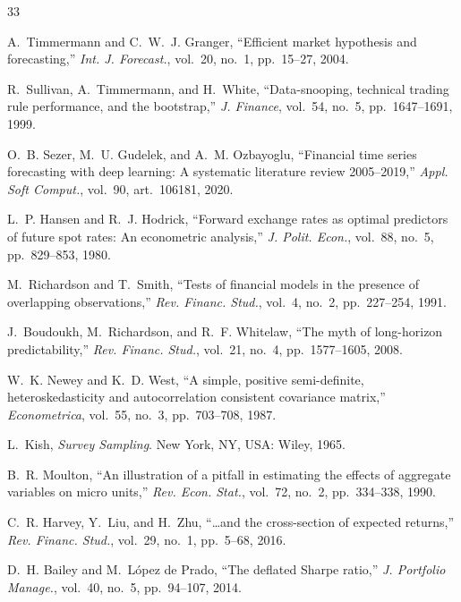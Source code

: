 \documentclass[conference]{IEEEtran}
\begin{document}
\balance
\scriptsize
\setlength{\IEEEilabelindent}{0pt}
\begin{thebibliography}{33}
\setlength{\itemsep}{0pt plus 0.1pt}
\setlength{\parskip}{0pt}

 A.~Timmermann and C.~W.~J. Granger, ``Efficient market hypothesis and forecasting,'' \emph{Int. J. Forecast.}, vol.~20, no.~1, pp.~15--27, 2004.

 R.~Sullivan, A.~Timmermann, and H.~White, ``Data-snooping, technical trading rule performance, and the bootstrap,'' \emph{J. Finance}, vol.~54, no.~5, pp.~1647--1691, 1999.

 O.~B. Sezer, M.~U. Gudelek, and A.~M. Ozbayoglu, ``Financial time series forecasting with deep learning: A systematic literature review 2005--2019,'' \emph{Appl. Soft Comput.}, vol.~90, art.~106181, 2020.

 L.~P. Hansen and R.~J. Hodrick, ``Forward exchange rates as optimal predictors of future spot rates: An econometric analysis,'' \emph{J. Polit. Econ.}, vol.~88, no.~5, pp.~829--853, 1980.

 M.~Richardson and T.~Smith, ``Tests of financial models in the presence of overlapping observations,'' \emph{Rev. Financ. Stud.}, vol.~4, no.~2, pp.~227--254, 1991.

 J.~Boudoukh, M.~Richardson, and R.~F. Whitelaw, ``The myth of long-horizon predictability,'' \emph{Rev. Financ. Stud.}, vol.~21, no.~4, pp.~1577--1605, 2008.

 W.~K. Newey and K.~D. West, ``A simple, positive semi-definite, heteroskedasticity and autocorrelation consistent covariance matrix,'' \emph{Econometrica}, vol.~55, no.~3, pp.~703--708, 1987.

 L.~Kish, \emph{Survey Sampling}. New York, NY, USA: Wiley, 1965.

 B.~R. Moulton, ``An illustration of a pitfall in estimating the effects of aggregate variables on micro units,'' \emph{Rev. Econ. Stat.}, vol.~72, no.~2, pp.~334--338, 1990.

 C.~R. Harvey, Y.~Liu, and H.~Zhu, ``\ldots and the cross-section of expected returns,'' \emph{Rev. Financ. Stud.}, vol.~29, no.~1, pp.~5--68, 2016.

 D.~H. Bailey and M.~L\'opez de Prado, ``The deflated Sharpe ratio,'' \emph{J. Portfolio Manage.}, vol.~40, no.~5, pp.~94--107, 2014.


\end{thebibliography}
\end{document}
